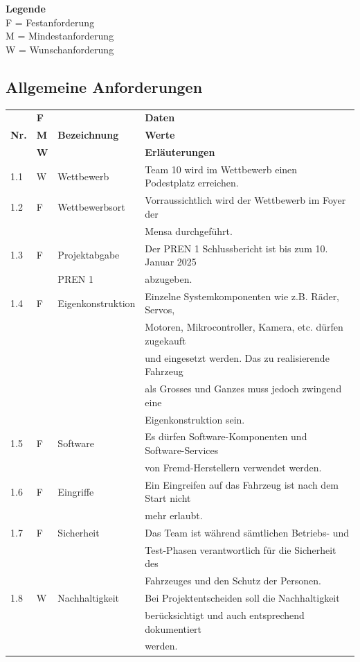 \documentclass[../main.tex]{subfiles}
\begin{document}
\textbf{Legende} \\ F = Festanforderung \\ M = Mindestanforderung \\ W = Wunschanforderung

\subsection{Allgemeine Anforderungen}
\begin{tabular}{|l|l|l|l|}
  \hline
  & \textbf{F} & & \textbf{Daten} \\
  \textbf{Nr.} & \textbf{M} & \textbf{Bezeichnung} & \textbf{Werte} \\
  & \textbf{W} & & \textbf{Erläuterungen} \\
  \hline
  1.1 & W & Wettbewerb & Team 10 wird im Wettbewerb einen Podestplatz
  erreichen. \\
  \hline
  1.2 & F & Wettbewerbsort & Vorraussichtlich wird der Wettbewerb im
  Foyer der \\
  & & & Mensa durchgeführt. \\
  \hline
  1.3 & F & Projektabgabe & Der PREN 1 Schlussbericht ist bis zum 10.
  Januar 2025 \\
  & & PREN 1 & abzugeben. \\
  \hline
  1.4 & F & Eigenkonstruktion & Einzelne Systemkomponenten wie z.B.
  Räder, Servos, \\
  & & & Motoren, Mikrocontroller, Kamera, etc. dürfen zugekauft \\
  & & & und eingesetzt werden. Das zu realisierende Fahrzeug \\
  & & & als Grosses und Ganzes muss jedoch zwingend eine \\
  & & & Eigenkonstruktion sein. \\
  \hline
  1.5 & F & Software & Es dürfen Software-Komponenten und Software-Services \\
  & & & von Fremd-Herstellern verwendet werden. \\
  \hline
  1.6 & F & Eingriffe & Ein Eingreifen auf das Fahrzeug ist nach dem
  Start nicht \\
  & & & mehr erlaubt. \\
  \hline
  1.7 & F & Sicherheit & Das Team ist während sämtlichen Betriebs- und \\
  & & & Test-Phasen verantwortlich für die Sicherheit des \\
  & & & Fahrzeuges und den Schutz der Personen. \\
  \hline
  1.8 & W & Nachhaltigkeit & Bei Projektentscheiden soll die Nachhaltigkeit \\
  & & & berücksichtigt und auch entsprechend dokumentiert \\
  & & & werden. \\
  \hline
\end{tabular}
\end{document}
